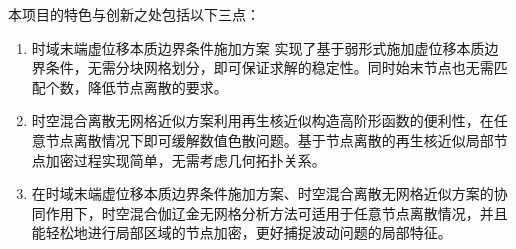 
本项目的特色与创新之处包括以下三点：

\begin{enumerate}[label=（\theenumi）,left=24pt]
    \item 时域末端虚位移本质边界条件施加方案
    实现了基于弱形式施加虚位移本质边界条件，无需分块网格划分，即可保证求解的稳定性。同时始末节点也无需匹配个数，降低节点离散的要求。
    \item 时空混合离散无网格近似方案利用再生核近似构造高阶形函数的便利性，在任意节点离散情况下即可缓解数值色散问题。基于节点离散的再生核近似局部节点加密过程实现简单，无需考虑几何拓扑关系。
    \item 在时域末端虚位移本质边界条件施加方案、时空混合离散无网格近似方案的协同作用下，时空混合伽辽金无网格分析方法可适用于任意节点离散情况，并且能轻松地进行局部区域的节点加密，更好捕捉波动问题的局部特征。
\end{enumerate}


